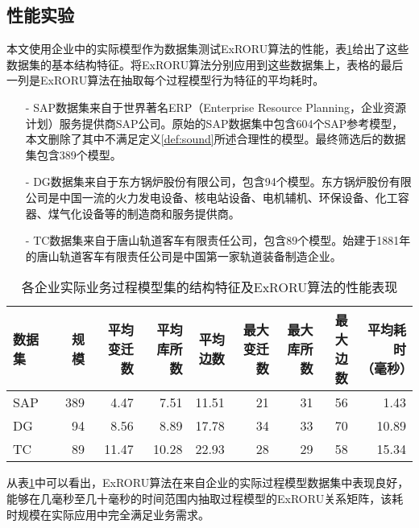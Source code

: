 \subsection{性能实验}\label{subsec:efficiency}
本文使用企业中的实际模型作为数据集测试ExRORU算法的性能，表\ref{tab:efficiency_dataset}给出了这些数据集的基本结构特征。将ExRORU算法分别应用到这些数据集上，表格的最后一列是ExRORU算法在抽取每个过程模型行为特征的平均耗时。
\begin{itemize}
  \item[-] SAP数据集来自于世界著名ERP（Enterprise Resource Planning，企业资源计划）服务提供商SAP公司。原始的SAP数据集中包含604个SAP参考模型，本文删除了其中不满足定义\ref{def:sound}所述合理性的模型。最终筛选后的数据集包含389个模型。
  \item[-] DG数据集来自于东方锅炉股份有限公司，包含94个模型。东方锅炉股份有限公司是中国一流的火力发电设备、核电站设备、电机辅机、环保设备、化工容器、煤气化设备等的制造商和服务提供商。
  \item[-] TC数据集来自于唐山轨道客车有限责任公司，包含89个模型。始建于1881年的唐山轨道客车有限责任公司是中国第一家轨道装备制造企业。
\end{itemize}

\begin{table}[htbp]
  \centering
  \caption{各企业实际业务过程模型集的结构特征及ExRORU算法的性能表现}
  \label{tab:efficiency_dataset}
  \begin{tabular}{lrrrrrrrr}
    \toprule[1.5pt]
    数据集 & 规模 & \tabincell{r}{平均\\变迁数} & \tabincell{r}{平均\\库所数} & \tabincell{r}{平均\\边数} & \tabincell{r}{最大\\变迁数} & \tabincell{r}{最大\\库所数} & \tabincell{r}{最大\\边数} & \tabincell{r}{平均耗时\\（毫秒）}\\ \midrule[1pt]
    SAP & 389 & 4.47 & 7.51 & 11.51 & 21 & 31 & 56 & 1.43\\
    DG & 94 & 8.56 & 8.89 & 17.78 & 34 & 33 & 70 & 10.89\\
    TC & 89 & 11.47 & 10.28 & 22.93 & 28 & 29 & 58 & 15.34\\
    \bottomrule[1.5pt]
  \end{tabular}
\end{table}

从表\ref{tab:efficiency_dataset}中可以看出，ExRORU算法在来自企业的实际过程模型数据集中表现良好，能够在几毫秒至几十毫秒的时间范围内抽取过程模型的ExRORU关系矩阵，该耗时规模在实际应用中完全满足业务需求。

